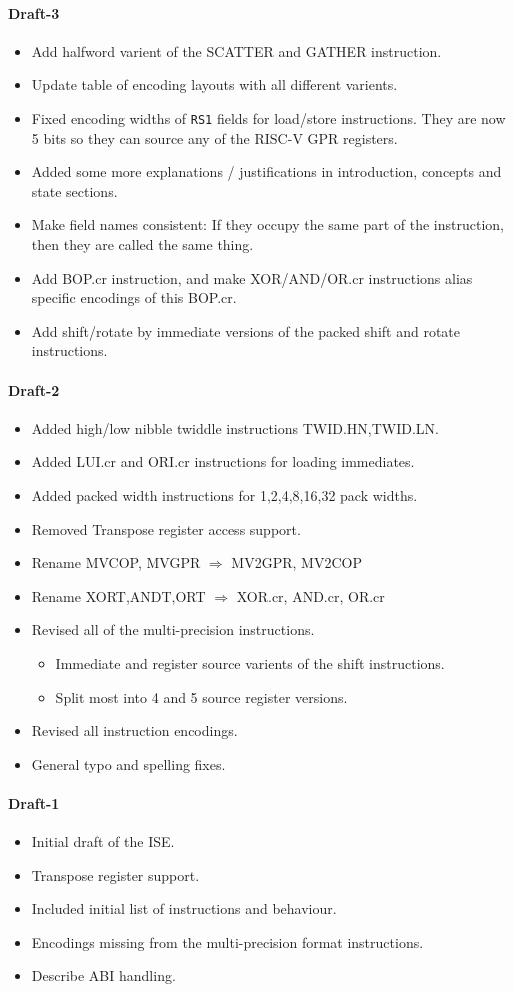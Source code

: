 
\paragraph{Draft-3}
\begin{itemize}
\item Add halfword varient of the SCATTER and GATHER instruction.
\item Update table of encoding layouts with all different varients.
\item Fixed encoding widths of {\tt RS1} fields for load/store
    instructions. They are now 5 bits so they can source any of the
    RISC-V GPR registers.
\item Added some more explanations / justifications in introduction,
    concepts and state sections.
\item Make field names consistent: If they occupy the same part of
    the instruction, then they are called the same thing.
\item Add BOP.cr instruction, and make XOR/AND/OR.cr instructions
    alias specific encodings of this BOP.cr.
\item Add shift/rotate by immediate versions of the packed
    shift and rotate instructions.
\end{itemize}

\paragraph{Draft-2}
\begin{itemize}
\item Added high/low nibble twiddle instructions TWID.HN,TWID.LN.
\item Added LUI.cr and ORI.cr instructions for loading immediates.
\item Added packed width instructions for 1,2,4,8,16,32 pack widths.
\item Removed Transpose register access support.
\item Rename MVCOP, MVGPR  $\Rightarrow$ MV2GPR, MV2COP
\item Rename XORT,ANDT,ORT $\Rightarrow$ XOR.cr, AND.cr, OR.cr
\item Revised all of the multi-precision instructions.
\begin{itemize}
    \item Immediate and register source varients of the shift instructions.
    \item Split most into 4 and 5 source register versions.
\end{itemize}
\item Revised all instruction encodings.
\item General typo and spelling fixes.
\end{itemize}

\paragraph{Draft-1}
\begin{itemize}
\item Initial draft of the ISE.
\item Transpose register support.
\item Included initial list of instructions and behaviour.
\item Encodings missing from the multi-precision format instructions.
\item Describe ABI handling.
\end{itemize}
